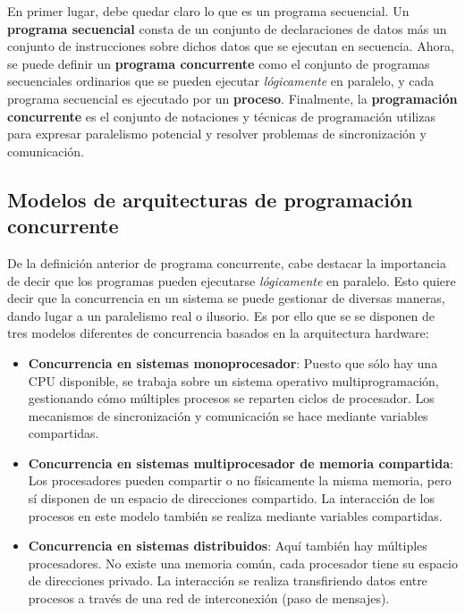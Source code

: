 En primer lugar, debe quedar claro lo que es un programa secuencial. Un \textbf{programa secuencial} consta de un conjunto de declaraciones de datos más un conjunto de instrucciones sobre dichos datos que se ejecutan en secuencia. Ahora, se puede definir un \textbf{programa concurrente} como el conjunto de programas secuenciales ordinarios que se pueden ejecutar \textit{lógicamente} en paralelo, y cada programa secuencial es ejecutado por un \textbf{proceso}. Finalmente, la \textbf{programación concurrente} es el conjunto de notaciones y técnicas de programación utilizas para expresar paralelismo potencial y resolver problemas de sincronización y comunicación.

\subsection{Modelos de arquitecturas de programación concurrente}\label{subsec:concurrentarch}
De la definición anterior de programa concurrente, cabe destacar la importancia de decir que los programas pueden ejecutarse \textit{lógicamente} en paralelo. Esto quiere decir que la concurrencia en un sistema se puede gestionar de diversas maneras, dando lugar a un paralelismo real o ilusorio. Es por ello que se se disponen de tres modelos diferentes de concurrencia basados en la arquitectura hardware:

\begin{itemize}
    \item \textbf{Concurrencia en sistemas monoprocesador}: Puesto que sólo hay una CPU disponible, se trabaja sobre un sistema operativo multiprogramación, gestionando cómo múltiples procesos se reparten ciclos de procesador. Los mecanismos de sincronización y comunicación se hace mediante variables compartidas.
    \item \textbf{Concurrencia en sistemas multiprocesador de memoria compartida}: Los procesadores pueden compartir o no físicamente la misma memoria, pero sí disponen de un espacio de direcciones compartido. La interacción de los procesos en este modelo también se realiza mediante variables compartidas.
    \item \textbf{Concurrencia en sistemas distribuidos}: Aquí también hay múltiples procesadores. No existe una memoria común, cada procesador tiene su espacio de direcciones privado. La interacción se realiza transfiriendo datos entre procesos a través de una red de interconexión (paso de mensajes).
\end{itemize}

